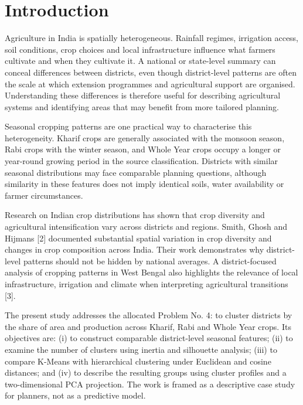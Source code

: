 \documentclass[9pt,a4paper,twocolumn]{extarticle}
\begin{document}
\section{Introduction}
Agriculture in India is spatially heterogeneous. Rainfall regimes, irrigation access, soil conditions, crop choices and local infrastructure influence what farmers cultivate and when they cultivate it. A national or state-level summary can conceal differences between districts, even though district-level patterns are often the scale at which extension programmes and agricultural support are organised. Understanding these differences is therefore useful for describing agricultural systems and identifying areas that may benefit from more tailored planning.

Seasonal cropping patterns are one practical way to characterise this heterogeneity. Kharif crops are generally associated with the monsoon season, Rabi crops with the winter season, and Whole Year crops occupy a longer or year-round growing period in the source classification. Districts with similar seasonal distributions may face comparable planning questions, although similarity in these features does not imply identical soils, water availability or farmer circumstances.

Research on Indian crop distributions has shown that crop diversity and agricultural intensification vary across districts and regions. Smith, Ghosh and Hijmans [2] documented substantial spatial variation in crop diversity and changes in crop composition across India. Their work demonstrates why district-level patterns should not be hidden by national averages. A district-focused analysis of cropping patterns in West Bengal also highlights the relevance of local infrastructure, irrigation and climate when interpreting agricultural transitions [3].

The present study addresses the allocated Problem No. 4: to cluster districts by the share of area and production across Kharif, Rabi and Whole Year crops. Its objectives are: (i) to construct comparable district-level seasonal features; (ii) to examine the number of clusters using inertia and silhouette analysis; (iii) to compare K-Means with hierarchical clustering under Euclidean and cosine distances; and (iv) to describe the resulting groups using cluster profiles and a two-dimensional PCA projection. The work is framed as a descriptive case study for planners, not as a predictive model.
\end{document}
